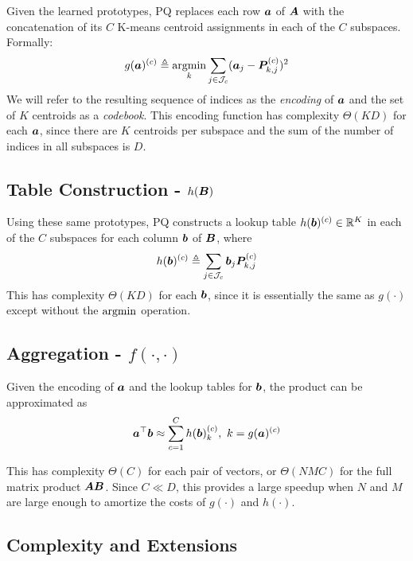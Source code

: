 Given the learned prototypes, PQ replaces each row $\bm{a}$ of $\bm{A}$ with the concatenation of its $C$ K-means centroid assignments in each of the $C$ subspaces. Formally:
\begin{align} \label{eq:pqLoss}
    g(\bm{a})^{(c)} \triangleq \operatorname*{argmin}_k \sum_{j\in \mathcal{J}_c} (\bm{a}_j - \bm{P}^{(c)}_{k,j})^2
\end{align}
We will refer to the resulting sequence of indices as the \textit{encoding} of $\bm{a}$ and the set of $K$ centroids as a \textit{codebook}. This encoding function has complexity $\Theta(KD)$ for each $\bm{a}$, since there are $K$ centroids per subspace and the sum of the number of indices in all subspaces is $D$.

\subsection{Table Construction - $h(\bm{B})$}

Using these same prototypes, PQ constructs a lookup table $h(\bm{b})^{(c)} \in \mathbb{R}^K$ in each of the $C$ subspaces for each column $\bm{b}$ of $\bm{B}$, where
\begin{align}
    h(\bm{b})^{(c)} \triangleq \sum_{j\in \mathcal{J}_c} \bm{b}_j \bm{P}^{(c)}_{k,j}
\end{align}
This has complexity $\Theta(KD)$ for each $\bm{b}$, since it is essentially the same as $g(\cdot)$ except without the $\operatorname*{argmin}$ operation.

\subsection{Aggregation - $f(\cdot,\cdot)$}

Given the encoding of $\bm{a}$ and the lookup tables for $\bm{b}$, the product can be approximated as
\begin{align}
    \bm{a}^\top \bm{b} \approx \sum_{c=1}^C h(\bm{b})^{(c)}_k, \text{ }k = g(\bm{a})^{(c)}
\end{align}

This has complexity $\Theta(C)$ for each pair of vectors, or $\Theta(NMC)$ for the full matrix product $\bm{A}\bm{B}$. Since $C \ll D$, this provides a large speedup when $N$ and $M$ are large enough to amortize the costs of $g(\cdot)$ and $h(\cdot)$.

\subsection{Complexity and Extensions}

